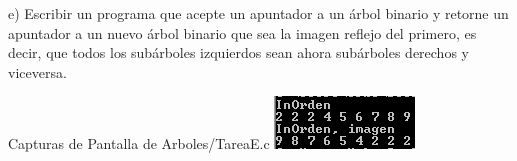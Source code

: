 e) Escribir un programa que acepte un apuntador a un
árbol binario y retorne un apuntador a un nuevo árbol
binario que sea la imagen reflejo del primero, es decir,
que todos los subárboles izquierdos sean ahora subárboles
derechos y viceversa.

Capturas de Pantalla de Arboles/TareaE.c
\newline
\includegraphics{Arboles/img/TareaE_1.png}